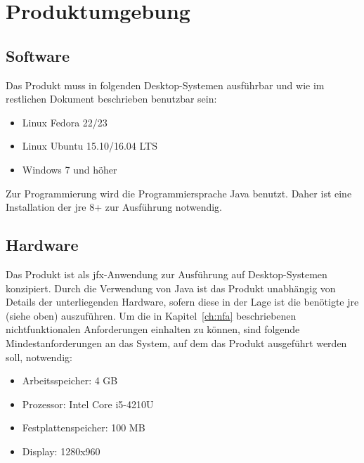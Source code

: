 \chapter{Produktumgebung}
\label{ch:umgebung}

\section{Software}
Das Produkt muss in folgenden Desktop-Systemen ausführbar und wie im restlichen Dokument beschrieben benutzbar sein:
\begin{itemize}
  \setlength\itemsep{0em}
  \item Linux Fedora 22/23 %
  \item Linux Ubuntu 15.10/16.04 LTS
  \item Windows 7 und höher
\end{itemize}
Zur Programmierung wird die Programmiersprache Java benutzt. Daher ist eine Installation der \gls{jre} 8+ zur Ausführung notwendig.

\section{Hardware}
Das Produkt ist als \gls{jfx}-Anwendung zur Ausführung auf Desktop-Systemen konzipiert.
Durch die Verwendung von Java ist das Produkt unabhängig von Details der unterliegenden Hardware, sofern diese in der Lage ist die benötigte \gls{jre} (siehe oben) auszuführen.
Um die in Kapitel~\ref{ch:nfa} beschriebenen nichtfunktionalen Anforderungen einhalten zu können, sind folgende Mindestanforderungen an das System, auf dem das Produkt ausgeführt werden soll, notwendig:

\begin{itemize}
  \setlength\itemsep{0em}
  \item Arbeitsspeicher: 4 GB
  \item Prozessor: Intel Core i5-4210U %
  \item Festplattenspeicher: 100 MB
  \item Display: 1280x960
\end{itemize}
